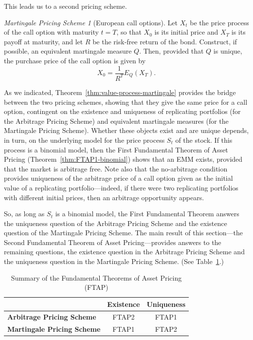 \documentclass[11pt, openany, oneside]{book}
\theoremstyle{definition}
\theoremstyle{remark}
\theoremstyle{boldital}
\newtheorem*{mart}{Martingale Pricing Scheme}
\numberwithin{equation}{section}
\begin{document}
This leads us to a second pricing scheme.

\begin{mart}[European call options]
Let $X_t$ be the price process of the call option with maturity $t=T$, so that $X_0$ is its initial price and $X_T$ is its payoff at maturity, and let $R$ be the risk-free return of the bond. Construct, if possible, an equivalent martingale measure $Q$. Then, provided that $Q$ is unique, the purchase price of the call option is given by
\[
	X_0 = \frac{1}{R^T}E_Q(X_T).
\]
\end{mart}

As we indicated, Theorem~\ref{thm:value-process-martingale} provides the bridge between the two pricing schemes, showing that they give the same price for a call option, contingent on the existence and uniqueness of replicating portfolios (for the Arbitrage Pricing Scheme) and equivalent martingale measures (for the Martingale Pricing Scheme). Whether these objects exist and are unique depends, in turn, on the underlying model for the price process $S_t$ of the stock. If this process is a binomial model, then the First Fundamental Theorem of Asset Pricing (Theorem~\ref{thm:FTAP1-binomial}) shows that an EMM exists, provided that the market is arbitrage free. Note also that the no-arbitrage condition provides uniqueness of the arbitrage price of a call option given as the initial value of a replicating portfolio—indeed, if there were two replicating portfolios with different initial prices, then an arbitrage opportunity appears.

So, as long as $S_t$ is a binomial model, the First Fundamental Theorem answers the uniqueness question of the Arbitrage Pricing Scheme and the existence question of the Martingale Pricing Scheme. The main result of this section—the Second Fundamental Theorem of Asset Pricing—provides answers to the remaining questions, the existence question in the Arbitrage Pricing Scheme and the uniqueness question in the Martingale Pricing Scheme. (See Table~\ref{tab:ftap}.)

\begin{table}[t]
\centering
\begin{tabular}{lcc}
\hline
 & \textbf{Existence} & \textbf{Uniqueness} \\
\hline
\textbf{Arbitrage Pricing Scheme}  & FTAP2 & FTAP1 \\
\textbf{Martingale Pricing Scheme} & FTAP1  & FTAP2 \\
\hline
\end{tabular}
\caption{Summary of the Fundamental Theorems of Asset Pricing (FTAP)}
\label{tab:ftap}
\end{table}
\end{document}
